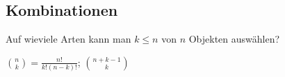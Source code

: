\subsection{Kombinationen}
{\scriptsize Auf wieviele Arten kann man $k \leq n$ von $n$ Objekten auswählen?}

 ${n \choose k} = \frac{n!}{k!(n - k)!}$;
 ${n + k - 1 \choose k}$
